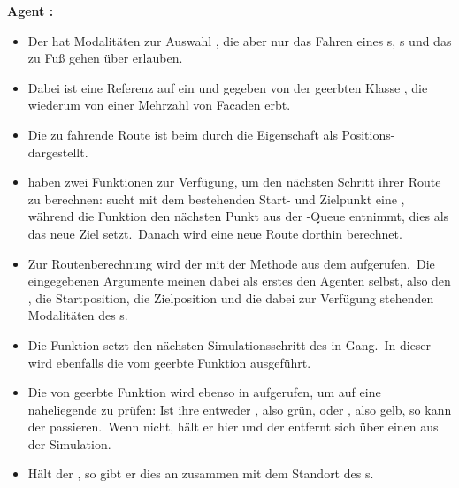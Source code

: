 \textbf{Agent :}
\begin{itemize}
    \item Der  hat Modalitäten zur Auswahl , die aber nur das Fahren eines s, s und das zu Fuß gehen über  erlauben.
    \item Dabei ist eine Referenz auf ein  und  gegeben von der geerbten Klasse , die wiederum von einer Mehrzahl von Facaden erbt.
    \item Die zu fahrende Route ist beim  durch die Eigenschaft  als Positions- dargestellt.
    \item {} haben zwei Funktionen zur Verfügung, um den nächsten Schritt ihrer Route zu berechnen:  sucht mit dem bestehenden Start- und Zielpunkt eine , während die Funktion  den nächsten Punkt aus der -Queue entnimmt, dies als das neue Ziel setzt.~Danach wird eine neue Route dorthin berechnet.
    \item Zur Routenberechnung wird der  mit der Methode\linebreak{} aus dem  aufgerufen.~Die eingegebenen Argumente meinen dabei als erstes den Agenten selbst, also den , die Startposition, die Zielposition und die dabei zur Verfügung stehenden Modalitäten des s.
    \item Die Funktion  setzt den nächsten Simulationsschritt des  in Gang.~In dieser wird ebenfalls die vom  geerbte Funktion  ausgeführt.
    \item Die von  geerbte Funktion  wird ebenso in  aufgerufen, um auf eine naheliegende  zu prüfen: Ist ihre  entweder , also grün, oder , also gelb, so kann der  passieren.~Wenn nicht, hält er hier und der  entfernt sich über einen  aus der Simulation.
    \item Hält der , so gibt er dies an zusammen mit dem Standort des s.
\end{itemize}

